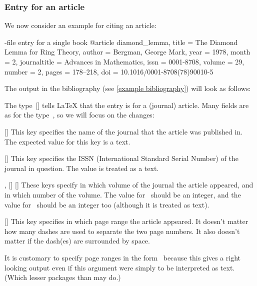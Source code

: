 \subsubsection{Entry for an article}

We now consider an example for citing an article:

\begin{showcode}[label = {bib entry article}]{-file entry for a single book}
@article {diamond_lemma,
  title         = {The Diamond Lemma for Ring Theory},
  author        = {Bergman, George Mark},
  year          = {1978},
  month         = {2},
  journaltitle  = {Advances in Mathematics},
  issn          = {0001-8708},
  volume        = {29},
  number        = {2},
  pages         = {178--218},
  doi           = {10.1016/0001-8708(78)90010-5}
}
\end{showcode}
The output in the bibliography (see \cref{example bibliography}) will look as follows:

The type~[\atname] tells {\LaTeX} that the entry is for a (journal) article.
Many fields are as for the type~, so we will focus on the changes:
\begin{mydescription}
  \item[\optname{journaltitle}]
    [\optname]
    This key specifies the name of the journal that the article was published in.
    The expected value for this key is a text.
  \item[\optname{issn}]
    [\optname]
    This key specifies the ISSN (International Standard Serial Number) of the journal in question.
    The value is treated as a text.
  \item[\optname{volume}, \optname{number}]
    [\optname]
    [\optname]
    These keys specify in which volume of the journal the article appeared, and in which number of the volume.
    The value for~ should be an integer, and the value for~ should be an integer too (although it is treated as text).
  \item[\optname{pages}]
    [\optname]
    This key specifies in which page range the article appeared.
    It doesn’t matter how many dashes are used to separate the two page numbers.
    It also doesn’t matter if the dash(es) are surrounded by space.
    
    It is customary to specify page ranges in the form~ because this gives a right looking output even if this argument were simply to be interpreted as text.
    (Which lesser packages than  may do.)
\end{mydescription}

